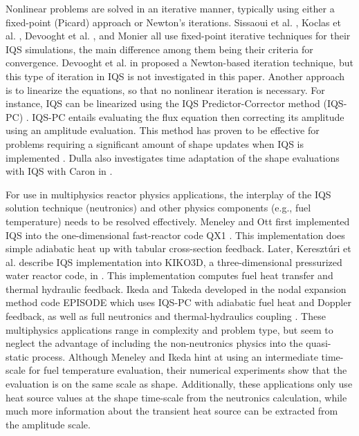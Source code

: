 \documentclass{elsarticle}
\newcommand{\iqspc}{IQS-PC\xspace}
\begin{document}
Nonlinear problems are solved in an iterative manner, typically using either a fixed-point (Picard) approach or Newton's iterations. Sissaoui et al. \cite{Sissaoui_1995}, Koclas et al. \cite{Koclas_1996}, Devooght et al. \cite{Devooght_1984}, and Monier \cite{Monier_diss} all use fixed-point iterative techniques for their IQS simulations, the main difference among them being their criteria for convergence.  Devooght et al. in \cite{Devooght_1984} proposed a Newton-based iteration technique, but this type of iteration in IQS is not investigated in this paper. Another approach is to linearize the equations, so that no nonlinear iteration is necessary. For instance, IQS can be linearized using the IQS Predictor-Corrector method (\iqspc) \cite{dulla2006}. \iqspc entails evaluating the flux equation then correcting its amplitude using an amplitude evaluation. This method has proven to be effective for problems requiring a significant amount of shape updates when IQS is implemented \cite{Dulla2008}. Dulla also investigates time adaptation of the shape evaluations with IQS with Caron in \cite{caron2017}.

For use in multiphysics reactor physics applications, the interplay of the IQS solution technique (neutronics) and other physics components (e.g., fuel temperature) needs to be resolved effectively. Meneley and Ott first implemented IQS into the one-dimensional fast-reactor code QX1 \cite{Meneley_1971}. This implementation does simple adiabatic heat up with tabular cross-section feedback. Later, Kereszt\'{u}ri et al. describe IQS implementation into KIKO3D, a three-dimensional pressurized water reactor code, in \cite{KIKO3D_2003}. This implementation computes fuel heat transfer and thermal hydraulic feedback. Ikeda and Takeda developed in the nodal expansion method code EPISODE which uses \iqspc with adiabatic fuel heat and Doppler feedback, as well as full neutronics and thermal-hydraulics coupling \cite{Ikeda_2001}. These multiphysics applications range in complexity and problem type, but seem to neglect the advantage of including the non-neutronics physics into the quasi-static process. Although Meneley and Ikeda hint at using an intermediate time-scale for fuel temperature evaluation, their numerical experiments show that the evaluation is on the same scale as shape. Additionally, these applications only use heat source values at the shape time-scale from the neutronics calculation, while much more information about the transient heat source can be extracted from the amplitude scale.
\end{document}

